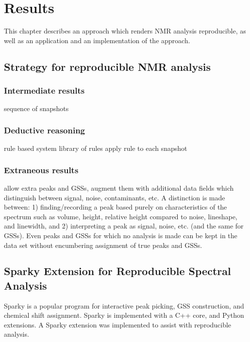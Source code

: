 \chapter{Results}

This chapter describes an approach which renders NMR analysis reproducible,
as well as an application and an implementation of the approach.



\section{Strategy for reproducible NMR analysis}

\subsection{Intermediate results}
sequence of snapshots

\subsection{Deductive reasoning}
rule based system
library of rules
apply rule to each snapshot

\subsection{Extraneous results}
allow extra peaks and GSSs, augment them with additional data fields which distinguish between signal, 
noise, contaminants, etc.  A distinction is made 
between: 1) finding/recording a peak based purely on characteristics of 
the spectrum such as volume, height, relative height compared to noise, 
lineshape, and linewidth, and 2) interpreting a peak as signal, noise, 
etc. (and the same for GSSs).  Even peaks and GSSs for 
which no analysis is made can be kept in the data set without encumbering 
assignment of true peaks and GSSs.



\section{Sparky Extension for Reproducible Spectral Analysis}

Sparky \cite{sparky} is a popular program for interactive peak picking,
GSS construction, and chemical shift assignment.  Sparky is implemented 
with a C++ core, and Python extensions.
A Sparky extension was implemented to assist with reproducible analysis.

